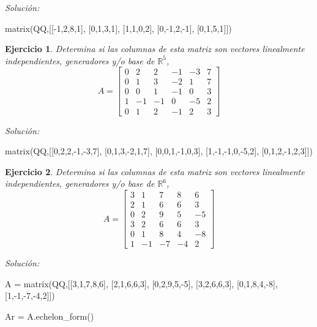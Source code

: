 \documentclass{amsart}
\newtheorem{ejer}{Ejercicio}
\begin{document}
{\it Soluci\'on:}

\begin{sageblock}
matrix(QQ,[[-1,2,8,1],
[0,1,3,1],
[1,1,0,2],
[0,-1,2,-1],
[0,1,5,1]])
\end{sageblock}



\begin{ejer} Determina si las columnas de esta matriz son vectores linealmente independientes, generadores y/o base de ${{\mathbb R}}^{5}$,
\[ A = \left[\begin{array}{rrrrrr}
0 & 2 & 2 & -1 & -3 & 7 \\
0 & 1 & 3 & -2 & 1 & 7 \\
0 & 0 & 1 & -1 & 0 & 3 \\
1 & -1 & -1 & 0 & -5 & 2 \\
0 & 1 & 2 & -1 & 2 & 3
\end{array}\right] \]
\end{ejer}

{\it Soluci\'on:}

\begin{sageblock}
matrix(QQ,[[0,2,2,-1,-3,7],
[0,1,3,-2,1,7],
[0,0,1,-1,0,3],
[1,-1,-1,0,-5,2],
[0,1,2,-1,2,3]])
\end{sageblock}



\begin{ejer} Determina si las columnas de esta matriz son vectores linealmente independientes, generadores y/o base de ${{\mathbb R}}^{6}$,
\[ A = \left[\begin{array}{rrrrr}
3 & 1 & 7 & 8 & 6 \\
2 & 1 & 6 & 6 & 3 \\
0 & 2 & 9 & 5 & -5 \\
3 & 2 & 6 & 6 & 3 \\
0 & 1 & 8 & 4 & -8 \\
1 & -1 & -7 & -4 & 2
\end{array}\right] \]
\end{ejer}

{\it Soluci\'on:}

\begin{sageblock}
A = matrix(QQ,[[3,1,7,8,6],
[2,1,6,6,3],
[0,2,9,5,-5],
[3,2,6,6,3],
[0,1,8,4,-8],
[1,-1,-7,-4,2]])

Ar = A.echelon_form()

\end{sageblock}
\end{document}
